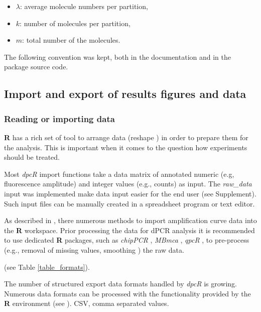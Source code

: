 \documentclass[a4,center,fleqn]{NAR}
\begin{document}
\begin{itemize}
 \item $\lambda$: average molecule numbers per partition,
 \item $k$: number of molecules per partition,
 \item $m$: total number of the molecules.
\end{itemize}

The following convention was kept, both in the documentation and in the 
package source code.

\subsection{Import and export of results figures and data}

\subsubsection{Reading or importing data}

\textbf{R} has a rich set of tool to arrange data (reshape \cite{Wickham_2007}) 
in order to prepare them for the analysis. This is important when it comes to 
the question how experiments should be treated.

Most \textit{dpcR} import functions take a data matrix of annotated numeric 
(e.g, fluorescence amplitude) and integer values (e.g., counts) as input. The 
\textit{raw\_data} input was implemented  make data input easier for the end 
user (see Supplement). Such input files can be manually created in a spreadsheet 
program or text editor.

As described in \cite{ritz_qpcr_2008, perkins_readqpcr_2012, 
pabinger_survey_2014, rodiger_r_2015}, there numerous methods to import 
amplification curve data into the \textbf{R} workspace. Prior processing the 
data for dPCR analysis it is recommended to use dedicated \textbf{R} packages, 
such as \textit{chipPCR} \cite{roediger2015chippcr}, \textit{MBmca} 
\cite{rodiger_surface_2013}, \textit{qpcR} \cite{ritz_qpcr_2008}, to pre-process 
(e.g., removal of missing values, smoothing \cite{spiess_impact_2015}) the raw 
data.

(see Table \ref{table_formats}).

\begin{table}[b]
 {The number of structured export data formats handled by \textit{dpcR} is 
growing. Numerous data formats can be processed with the functionality provided 
by the \textbf{R} environment (see \cite{rodiger_r_2015}). CSV, comma separated 
values.}
\end{table}
\end{document}
